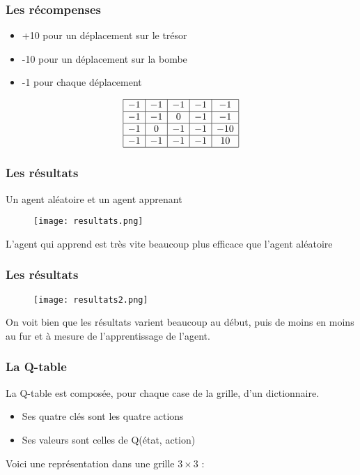 \documentclass{beamer}
\begin{document}
\begin{frame}
\frametitle{Les récompenses}
\begin{itemize}
\item +10 pour un déplacement sur le trésor
\item -10 pour un déplacement sur la bombe
\item -1 pour chaque déplacement
\end{itemize}
\pause
\centering
$$\begin{array}{|c|c|c|c|c|}
\hline
-1 & -1 & -1 & -1 & -1 \\
\hline
-1 & -1 & 0 & -1 & -1 \\
\hline
-1 & 0 & -1 & -1 & -10 \\
\hline
-1 & -1 & -1 & -1 & 10 \\
\hline
\end{array}
$$
\end{frame}

\begin{frame}
\frametitle{Les résultats}
Un agent aléatoire et un agent apprenant

\begin{figure}[!ht]
\hspace*{0cm}\texttt{[image: resultats.png]}
\end{figure}


L'agent qui apprend est très vite beaucoup plus efficace que l'agent aléatoire 
\end{frame}

\begin{frame}
\frametitle{Les résultats}
\begin{figure}[!ht]
\hspace*{0cm}\texttt{[image: resultats2.png]}
\label{recompgraph2}
\end{figure}
On voit bien que les résultats varient beaucoup au début, puis de moins en moins au fur et à mesure de l'apprentissage de l'agent. 
\end{frame}

\begin{frame}
\frametitle{La Q-table}

La Q-table est composée, pour chaque case de la grille, d'un dictionnaire. 
\begin{itemize}
\item Ses quatre clés sont les quatre actions
\item Ses valeurs sont celles de Q(état, action)
\end{itemize}
Voici une représentation dans une grille $3 \times 3$ : 
\end{frame}
\end{document}
